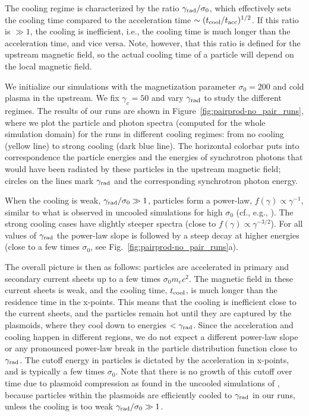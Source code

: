 The cooling regime is characterized by the ratio $\gamma_{\rm rad}/\sigma_0$, which effectively sets the cooling time compared to the acceleration time $\sim (t_{\rm cool}/t_{\rm acc})^{1/2}$. If this ratio is $\gg 1$, the cooling is inefficient, i.e., the cooling time is much longer than the acceleration time, and vice versa. Note, however, that this ratio is defined for the upstream magnetic field, so the actual cooling time of a particle will depend on the local magnetic field.

We initialize our simulations with the magnetization parameter $\sigma_0=200$ and cold plasma in the upstream. We fix $\gamma_c=50$ and vary $\gamma_{\rm rad}$ to study the different regimes. The results of our runs are shown in Figure~\ref{fig:pairprod-no_pair_runs}, where we plot the particle and photon spectra (computed for the whole simulation domain) for the runs in different cooling regimes: from no cooling (yellow line) to strong cooling (dark blue line). The horizontal colorbar puts into correspondence the particle energies and the energies of synchrotron photons that would have been radiated by these particles in the upstream magnetic field; circles on the lines mark $\gamma_{\rm rad}$ and the corresponding synchrotron photon energy.

When the cooling is weak, $\gamma_{\rm rad}/\sigma_0\gg 1$, particles form a power-law, $f(\gamma) \propto \gamma^{-1}$, similar to what is observed in uncooled simulations for high $\sigma_0$ (cf., e.g., \citealt{2014ApJ...783L..21S}). The strong cooling cases have slightly steeper spectra (close to $f(\gamma)\propto \gamma^{-3/2}$). For all values of $\gamma_{\rm rad}$ the power-law slope is followed by a steep decay at higher energies (close to a few times $\sigma_0$, see Fig.~\ref{fig:pairprod-no_pair_runs}a).

The overall picture is then as follows: particles are accelerated in primary and secondary current sheets up to a few times $\sigma_0 m_e c^2$. The magnetic field in these current sheets is weak, and the cooling time, $t_{\rm cool}$, is much longer than the residence time in the x-points. This means that the cooling is inefficient close to the current sheets, and the particles remain hot until they are captured by the plasmoids, where they cool down to energies $<\gamma_{\rm rad}$. Since the acceleration and cooling happen in different regions, we do not expect a different power-law slope or any pronounced power-law break in the particle distribution function close to $\gamma_{\rm rad}$. The cutoff energy in particles is dictated by the acceleration in x-points, and is typically a few times $\sigma_0$. Note that there is no growth of this cutoff over time due to plasmoid compression as found in the uncooled simulations of \cite{2018arXiv180800966P}, because particles within the plasmoids are efficiently cooled to $\gamma_{\rm rad}$ in our runs, unless the cooling is too weak $\gamma_{\rm rad}/\sigma_0\gg 1$.

